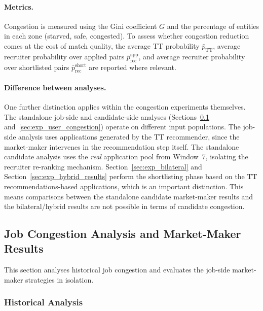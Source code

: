 \paragraph{Metrics.}
Congestion is measured using the Gini coefficient $G$ and the percentage of entities in each zone (starved, safe, congested). To assess whether congestion
reduction comes at the cost of match quality, the average \gls{TT} probability $\bar{p}_{\text{TT}}$, average recruiter 
probability over applied pairs $\bar{p}_{\text{rec}}^{\text{app}}$, and 
average recruiter probability over shortlisted pairs 
$\bar{p}_{\text{rec}}^{\text{short}}$ are reported where relevant.

\paragraph{Difference between analyses.} One further distinction applies within the congestion experiments 
themselves. The standalone job-side and candidate-side analyses 
(Sections~\ref{sec:exp_job_congestion} and~\ref{sec:exp_user_congestion}) 
operate on different input populations. The job-side analysis uses 
applications generated by the \gls{TT} recommender, since the 
market-maker intervenes in the recommendation step itself. The 
standalone candidate analysis uses the \emph{real} application pool 
from Window~7, isolating the recruiter re-ranking mechanism. Section~\ref{sec:exp_bilateral} and Section~\ref{sec:exp_hybrid_results} perform the shortlisting phase based on the \gls{TT} recommendations-based applications, which is an important distinction. This means comparisons between the standalone candidate market-maker results and the bilateral/hybrid results are not possible in terms of candidate congestion.


\subsection{Job Congestion Analysis and Market-Maker Results}
\label{sec:exp_job_congestion}
This section analyses historical job congestion and evaluates the job-side market-maker strategies in isolation.


\subsubsection{Historical Analysis}
\label{sec:exp_job_congestion_baseline}
 
